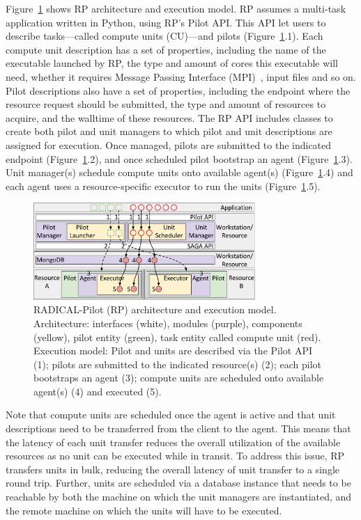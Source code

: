 \documentclass{webofc}
\begin{document}
Figure~\ref{fig:rp-arch} shows RP architecture and execution model. RP
assumes a multi-task application written in Python, using RP's Pilot API.
This API let users to describe tasks---called compute units (CU)---and pilots
(Figure~\ref{fig:rp-arch}.1). Each compute unit description has a set of
properties, including the name of the executable launched by RP, the type and
amount of cores this executable will need, whether it requires Message
Passing Interface (MPI)~\cite{gropp1999using}, input files and so on. Pilot
descriptions also have a set of properties, including the endpoint where the
resource request should be submitted, the type and amount of resources to
acquire, and the walltime of these resources. The RP API includes classes to
create both pilot and unit managers to which pilot and unit descriptions are
assigned for execution. Once managed, pilots are submitted to the indicated
endpoint (Figure~\ref{fig:rp-arch}.2), and once scheduled pilot bootstrap an
agent (Figure~\ref{fig:rp-arch}.3). Unit manager(s) schedule compute units
onto available agent(s) (Figure~\ref{fig:rp-arch}.4) and each agent uses a
resource-specific executor to run the units (Figure~\ref{fig:rp-arch}.5).

\begin{figure}
  \centering
  \includegraphics[width=0.75\textwidth]{figures/rp_arch.pdf}
  \caption{RADICAL-Pilot (RP) architecture and execution model. Architecture:
           interfaces (white), modules (purple), components (yellow), pilot
           entity (green), task entity called compute unit (red). Execution
           model: Pilot and units are described via the Pilot API (1); pilots
           are submitted to the indicated resource(s) (2); each pilot
           bootstraps an agent (3); compute units are scheduled onto
           available agent(s) (4) and executed (5).}\label{fig:rp-arch}
\end{figure}
	
Note that compute units are scheduled once the agent is active and that unit
descriptions need to be transferred from the client to the agent. This means
that the latency of each unit transfer reduces the overall utilization of the
available resources as no unit can be executed while in transit. To address
this issue, RP transfers units in bulk, reducing the overall latency of unit
transfer to a single round trip. Further, units are scheduled via a database
instance that needs to be reachable by both the machine on which the unit
managers are instantiated, and the remote machine on which the units will
have to be executed.
	
\end{document}
